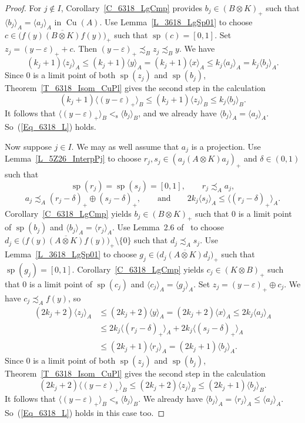 \documentclass[10pt]{amsart}
\numberwithin{equation}{section}
\theoremstyle{definition}
\newcommand{\dt}{\delta}
\newcommand{\ep}{\varepsilon}
\newcommand{\spec}{{\operatorname{sp}}}
\newcommand{\Cu}{{\operatorname{Cu}}}
\newcommand{\pj}{projection}
\newcommand{\Kt}{K \otimes}
\newcommand{\cc}[1]{\langle #1 \rangle}
\newcommand{\ccA}[1]{\langle #1 \rangle_A}
\newcommand{\ccB}[1]{\langle #1 \rangle_B}
\newcommand{\ten}{\otimes}
\newcommand{\les}{<_{\operatorname{s}}}
\begin{document}
\begin{proof}
For $j \not\in I$, Corollary~\ref{C_6318_LgCmp} provides
$b_j \in (B \ten K)_{+}$ such that
$\cc{b_j}_A = \cc{a_j}_A$ in $\Cu (A)$.
Use Lemma~\ref{L_3618_LgSp01} to choose
$c \in \bigl( {\overline{f (y) (B \otimes K) f (y)}} \bigr)_{+}$
such that $\spec (c) = [0, 1]$.
Set $z_j = (y - \ep)_{+} + c$.
Then $(y - \ep)_{+} \precsim_B z_j \precsim_B y$.
We have
\[
(k_j + 1) \ccA{z_j}
 \leq (k_j + 1) \ccA{y}
 = (k_j + 1) \ccA{x}
 \leq k_j \ccA{a_j}
 = k_j \ccA{b_j}.
\]
Since $0$ is a limit point of both $\spec (z_j)$ and $\spec (b_j)$,
Theorem~\ref{T_6318_Isom_CuPl} gives the second step in
the calculation
\[
(k_j + 1) \ccB{(y - \ep)_{+}}
 \leq (k_j + 1) \ccB{z_j}
 \leq k_j \ccB{b_j}.
\]
It follows that $\ccB{(y - \ep)_{+}} \les \ccB{b_j}$,
and we already have $\cc{b_j}_A = \cc{a_j}_A$.
So~(\ref{Eq_6318_L}) holds.

Now suppose $j \in I$.
We may as well assume that $a_j$ is a \pj.
Use Lemma~\ref{L_5Z26_InterpPj} to choose
$r_j, s_j \in (a_j (A \otimes K) a_j)_{+}$ and $\dt \in (0, 1)$
such that
\[
\spec (r_j) = \spec (s_j) = [0, 1],
\qquad
r_j \precsim_A a_j,
\]
\[
a_j \precsim_A (r_j - \dt)_{+} \oplus (s_j - \dt)_{+},
\qquad {\mbox{and}} \qquad
2 k_j \ccA{s_j} \leq \ccA{(r_j - \dt)_{+}}.
\]
Corollary~\ref{C_6318_LgCmp} yields $b_j \in (B \otimes K)_{+}$
such that $0$ is a limit point of $\spec (b_j)$ and $\ccA{b_j} = \ccA{r_j}$.
Use Lemma~2.6 of~\cite{Phl40} to choose
$d_j \in \bigl( {\overline{f (y) (A \otimes K) f (y)}} \bigr)_{+}
    \setminus \{ 0 \}$
such that $d_j \precsim_A s_j$.
Use Lemma~\ref{L_3618_LgSp01} to choose
$g_j \in \bigl( {\overline{d_j (A \otimes K) d_j}} \bigr)_{+}$
such that $\spec (g_j) = [0, 1]$.
Corollary~\ref{C_6318_LgCmp} yields $c_j \in (\Kt B)_{+}$
such that $0$ is a limit point of $\spec (c_j)$ and $\ccA{c_j} = \ccA{g_j}$.
Set $z_j = (y - \ep)_{+} \oplus c_j$.
We have $c_j \precsim_A f (y)$, so
\[
\begin{split}
(2 k_j + 2) \ccA{z_j}
& \leq (2 k_j + 2) \ccA{y}
  = (2 k_j + 2) \ccA{x}
  \leq 2 k_j \ccA{a_j}
\\
& \leq 2 k_j \ccA{(r_j - \dt)_{+}} + 2 k_j \ccA{(s_j - \dt)_{+}}
\\
& \leq (2 k_j + 1) \ccA{r_j}
  = (2 k_j + 1) \ccA{b_j}.
\end{split}
\]
Since $0$ is a limit point of both $\spec (z_j)$ and $\spec (b_j)$,
Theorem~\ref{T_6318_Isom_CuPl} gives the second step in
the calculation
\[
(2 k_j + 2) \ccB{(y - \ep)_{+}}
 \leq (2 k_j + 2) \ccB{z_j}
 \leq (2 k_j + 1) \ccB{b_j}.
\]
It follows that $\ccB{(y - \ep)_{+}} \les \ccB{b_j}$.
We already have $\ccA{b_j} = \ccA{r_j} \leq \ccA{a_j}$.
So~(\ref{Eq_6318_L}) holds in this case too.


\end{proof}
\end{document}
